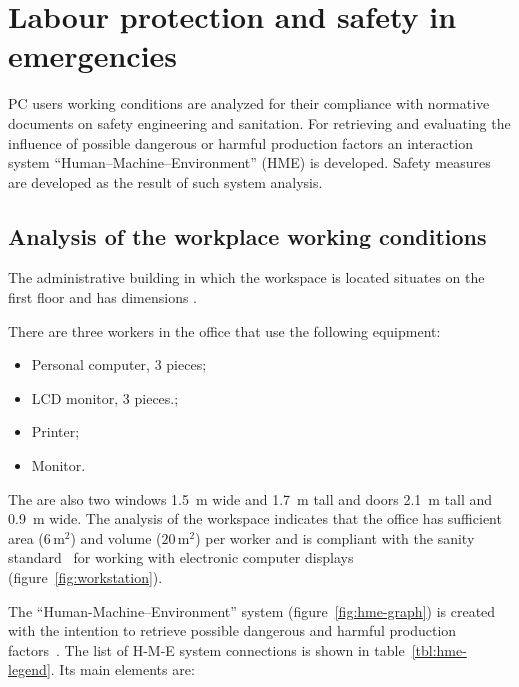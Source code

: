 
\chapter{Labour protection and safety in emergencies}
\label{sec:labour}

PC users working conditions are analyzed for
their compliance with normative documents on safety engineering  and
sanitation. For retrieving and evaluating the influence of possible dangerous
or harmful production factors an interaction system
``Human--Machine--Environment'' (HME) is developed. Safety measures are
developed as the result of such system analysis.

\section{Analysis of the workplace working conditions}

The administrative building in which the workspace is located situates on the
first floor and has dimensions .

There are three workers in the office that use the following equipment:
\begin{itemize}
    \item Personal computer, 3 pieces;
    \item LCD monitor, 3 pieces.;
    \item Printer;
    \item Monitor.
\end{itemize}
The are also two windows 1.5~m wide and 1.7~m tall and doors 2.1~m tall and
0.9~m wide.
The analysis of the workspace indicates that the office has sufficient area
($6 \, \text{m}^2$) and volume ($20 \, \text{m}^2$) per worker and is compliant
with the sanity standard~\cite{dsanpin} for working with electronic computer
displays (figure~\ref{fig:workstation}).

The ``Human-Machine--Environment'' system (figure~\ref{fig:hme-graph}) is
created with the intention to retrieve possible dangerous and harmful
production factors~\cite{npaop4-12}. The list of H-M-E system connections is
shown in table~\ref{tbl:hme-legend}. Its main elements are:


